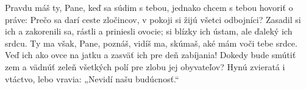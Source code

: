 Pravdu máš ty, Pane,
keď sa súdim s tebou,
jednako chcem s tebou hovoriť o práve:
Prečo sa darí ceste zločincov,
v pokoji si žijú všetci odbojníci?
Zasadil si ich a zakorenili sa,
rástli a priniesli ovocie;
si blízky ich ústam,
ale ďaleký ich srdcu.
Ty ma však, Pane, poznáš, vidíš ma,
skúmaš, aké mám voči tebe srdce.
Veď ich ako ovce na jatku
a zasväť ich pre deň zabíjania!
Dokedy bude smútiť zem
a vädnúť zeleň všetkých polí
pre zlobu jej obyvateľov?
Hynú zvieratá i vtáctvo,
lebo vravia: „Nevidí našu budúcnosť.“